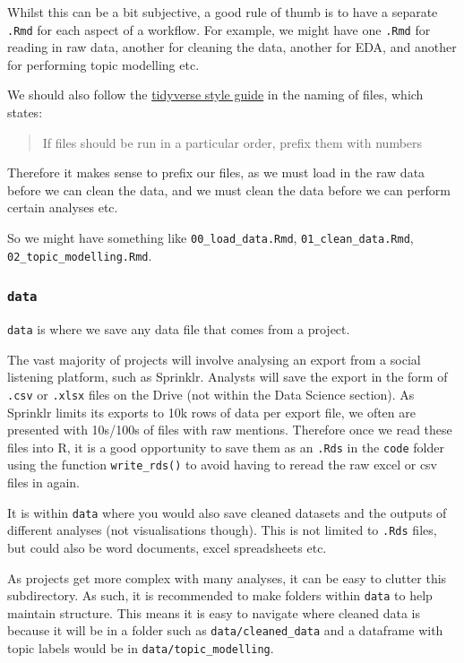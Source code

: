 \documentclass[
  letterpaper,
  DIV=11,
  numbers=noendperiod]{scrreprt}
\begin{document}
Whilst this can be a bit subjective, a good rule of thumb is to have a
separate \texttt{.Rmd} for each aspect of a workflow. For example, we
might have one \texttt{.Rmd} for reading in raw data, another for
cleaning the data, another for EDA, and another for performing topic
modelling etc.

We should also follow the
\href{https://style.tidyverse.org/index.html}{tidyverse style guide} in
the naming of files, which states:

\begin{quote}
If files should be run in a particular order, prefix them with numbers
\end{quote}

Therefore it makes sense to prefix our files, as we must load in the raw
data before we can clean the data, and we must clean the data before we
can perform certain analyses etc.

So we might have something like \texttt{00\_load\_data.Rmd},
\texttt{01\_clean\_data.Rmd}, \texttt{02\_topic\_modelling.Rmd}.

\subsubsection{\texorpdfstring{\texttt{data}}{data}}\label{data}

\texttt{data} is where we save any data file that comes from a project.

The vast majority of projects will involve analysing an export from a
social listening platform, such as Sprinklr. Analysts will save the
export in the form of \texttt{.csv} or \texttt{.xlsx} files on the Drive
(not within the Data Science section). As Sprinklr limits its exports to
10k rows of data per export file, we often are presented with 10s/100s
of files with raw mentions. Therefore once we read these files into R,
it is a good opportunity to save them as an \texttt{.Rds} in the
\texttt{code} folder using the function \texttt{write\_rds()} to avoid
having to reread the raw excel or csv files in again.

It is within \texttt{data} where you would also save cleaned datasets
and the outputs of different analyses (not visualisations though). This
is not limited to \texttt{.Rds} files, but could also be word documents,
excel spreadsheets etc.

As projects get more complex with many analyses, it can be easy to
clutter this subdirectory. As such, it is recommended to make folders
within \texttt{data} to help maintain structure. This means it is easy
to navigate where cleaned data is because it will be in a folder such as
\texttt{data/cleaned\_data} and a dataframe with topic labels would be
in \texttt{data/topic\_modelling}.
\end{document}
